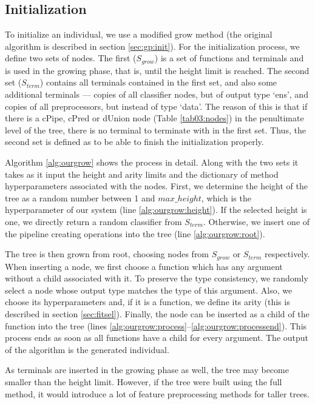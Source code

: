 \subsection{Initialization} \label{sec:init}
To initialize an individual, we use a modified grow method (the original algorithm
is described in section \ref{sec:gp:init}). For the initialization process, we
define two sets of nodes. The first ($S_{grow}$) is a set of functions and terminals and is used
in the growing phase, that is, until the height limit is reached. The second set ($S_{term}$)
contains all terminals contained in the first set, and also some additional
terminals --- copies of all classifier nodes, but of output type `ens', and copies
of all preprocessors, but instead of type `data'. The reason of this is that if
there is a cPipe, cPred or dUnion node (Table \ref{tab03:nodes}) in the penultimate level of the tree, there
is no terminal to terminate with in the first set. Thus, the second set is defined
as to be able to finish the initialization properly.

Algorithm \ref{alg:ourgrow} shows the process in detail. Along with the two sets it
takes as it input the height and arity limits and the dictionary of method hyperparameters
associated with the nodes.
First, we determine the height of the tree as a random number between 1 and
$max\_height$, which is the hyperparameter of our system
(line \ref{alg:ourgrow:height}). If the selected height is one, we directly return
a random classifier from $S_{term}$. Otherwise, we insert one of the pipeline
creating operations into the tree (line \ref{alg:ourgrow:root}).

The tree is then grown from root, choosing nodes from $S_{grow}$ or $S_{term}$
respectively. When inserting a node, we first choose a function which has any argument
without a child associated with it. To preserve the type consistency, we randomly
select a node whose output type matches the type of this argument. Also, we choose
its hyperparameters and, if it is a function, we define its arity (this is
described in section \ref{sec:fitsel}). Finally, the node can be inserted as a child
of the function into the tree
(lines \ref{alg:ourgrow:process}--\ref{alg:ourgrow:processend}). This process ends
as soon as all functions have a child for every argument. The output of the algorithm
is the generated individual.

As terminals are inserted in the growing phase as well, the tree may become
smaller than the height limit. However, if the tree were built using the full
method, it would introduce a lot of feature preprocessing methods for taller
trees.

